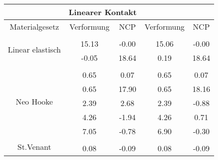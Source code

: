 \begin{table} 
\centering 
\begin{tabular}{c|cc|cc|} 
\cline{2-5} 
 & \multicolumn{2}{|c|}{Linearer Kontakt} &  \\ 
\hline 
\multicolumn{1}{|c|}{Materialgesetz} & \multicolumn{1}{c|}{Verformung} & \multicolumn{1}{c|}{NCP} & \multicolumn{1}{c|}{Verformung} & \multicolumn{1}{c|}{NCP} \\ 
\hline 
\multicolumn{1}{|c|}{\multirow{3}{*}{Linear elastisch}} &\multicolumn{1}{|c|}{} & \multicolumn{1}{|c|}{} & \multicolumn{1}{|c|}{} & \multicolumn{1}{|c|}{} \\ 
\multicolumn{1}{|c|}{} & \multicolumn{1}{|c|}{     15.13} & \multicolumn{1}{|c|}{     -0.00} & \multicolumn{1}{|c|}{     15.06} & \multicolumn{1}{|c|}{     -0.00} \\ 
\multicolumn{1}{|c|}{} & \multicolumn{1}{|c|}{     -0.05} & \multicolumn{1}{|c|}{     18.64} & \multicolumn{1}{|c|}{      0.19} & \multicolumn{1}{|c|}{     18.64} \\ 
\hline 
\multicolumn{1}{|c|}{\multirow{6}{*}{Neo Hooke}} &\multicolumn{1}{|c|}{} & \multicolumn{1}{|c|}{} & \multicolumn{1}{|c|}{} & \multicolumn{1}{|c|}{} \\ 
\multicolumn{1}{|c|}{} & \multicolumn{1}{|c|}{      0.65} & \multicolumn{1}{|c|}{      0.07} & \multicolumn{1}{|c|}{      0.65} & \multicolumn{1}{|c|}{      0.07} \\ 
\multicolumn{1}{|c|}{} & \multicolumn{1}{|c|}{      0.65} & \multicolumn{1}{|c|}{     17.90} & \multicolumn{1}{|c|}{      0.65} & \multicolumn{1}{|c|}{     18.16} \\ 
\multicolumn{1}{|c|}{} & \multicolumn{1}{|c|}{      2.39} & \multicolumn{1}{|c|}{      2.68} & \multicolumn{1}{|c|}{      2.39} & \multicolumn{1}{|c|}{     -0.88} \\ 
\multicolumn{1}{|c|}{} & \multicolumn{1}{|c|}{      4.26} & \multicolumn{1}{|c|}{     -1.94} & \multicolumn{1}{|c|}{      4.26} & \multicolumn{1}{|c|}{      0.71} \\ 
\multicolumn{1}{|c|}{} & \multicolumn{1}{|c|}{      7.05} & \multicolumn{1}{|c|}{     -0.78} & \multicolumn{1}{|c|}{      6.90} & \multicolumn{1}{|c|}{     -0.30} \\ 
\hline 
\multicolumn{1}{|c|}{\multirow{7}{*}{St.Venant}} &\multicolumn{1}{|c|}{} & \multicolumn{1}{|c|}{} & \multicolumn{1}{|c|}{} & \multicolumn{1}{|c|}{} \\ 
\multicolumn{1}{|c|}{} & \multicolumn{1}{|c|}{      0.08} & \multicolumn{1}{|c|}{     -0.09} & \multicolumn{1}{|c|}{      0.08} & \multicolumn{1}{|c|}{     -0.09} \\ 

\end{tabular}
\end{table}
